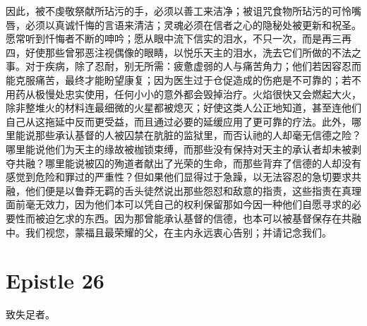 因此，被不虔敬祭献所玷污的手，必须以善工来洁净；被诅咒食物所玷污的可怜嘴唇，必须以真诚忏悔的言语来清洁；灵魂必须在信者之心的隐秘处被更新和祝圣。愿常听到忏悔者不断的呻吟；愿从眼中流下信实的泪水，不只一次，而是再三再四，好使那些曾邪恶注视偶像的眼睛，以悦乐天主的泪水，洗去它们所做的不法之事。对于疾病，除了忍耐，别无所需：疲惫虚弱的人与痛苦角力；他们若因容忍而能克服痛苦，最终才能盼望康复；因为医生过于仓促造成的伤疤是不可靠的；若不用药从极慢处忠实使用，任何小小的意外都会毁掉治疗。火焰很快又会燃起大火，除非整堆火的材料连最细微的火星都被熄灭；好使这类人公正地知道，甚至连他们自己从这拖延中反而更受益，而且通过必要的延缓应用了更可靠的疗法。此外，哪里能说那些承认基督的人被囚禁在肮脏的监狱里，而否认祂的人却毫无信德之险？哪里能说他们为天主的缘故被枷锁束缚，而那些没有保持对天主的承认者却未被剥夺共融？哪里能说被囚的殉道者献出了光荣的生命，而那些背弃了信德的人却没有感觉到危险和罪过的严重性？但如果他们显得过于急躁，以无法容忍的急切要求共融，他们便是以鲁莽无羁的舌头徒然说出那些怨怼和敌意的指责，这些指责在真理面前毫无效力，因为他们本可以凭自己的权利保留那如今因一种他们自愿寻求的必要性而被迫乞求的东西。因为那曾能承认基督的信德，也本可以被基督保存在共融中。我们视您，蒙福且最荣耀的父，在主内永远衷心告别；并请记念我们。\par



\section{Epistle 26}

致失足者。\par

\par

